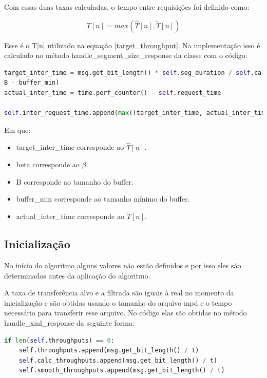 \documentclass[10pt,twocolumn,letterpaper]{article}
\begin{document}
	Com essas duas taxas calculadas, o tempo entre requisições foi definido como:
	
	\begin{equation}
		T[n] = max(\hat{T}[n], \tilde{T}[n])
	\end{equation}
	
	Esse é o T[n] utilizado na equação \ref{target_throughput}. Na implementação isso é calculado no método handle\_segment\_size\_response da classe com o código:
	
	\begin{lstlisting}[language=python]
target_inter_time = msg.get_bit_length() * self.seg_duration / self.calc_throughputs[-1] + beta * (
B - buffer_min)
actual_inter_time = time.perf_counter() - self.request_time

self.inter_request_time.append(max((target_inter_time, actual_inter_time))) 
	\end{lstlisting}
	
	Em que:
	
	\begin{itemize}
		\item target\_inter\_time corresponde ao $\hat{T}[n]$.
		\item beta corresponde ao $\beta$.
		\item B corresponde ao tamanho do buffer.
		\item buffer\_min corresponde ao tamanho mínimo do buffer.
		\item actual\_inter\_time corresponde ao $\tilde{T}[n]$.
	\end{itemize}
	
	\subsection{Inicialização}
	No início do algoritmo alguns valores não estão definidos e por isso eles são determinados antes da aplicação do algoritmo.
	
	A taxa de transferência alvo e a filtrada são iguais à real no momento da inicialização e são obtidas usando o tamanho do arquivo mpd e o tempo necessário para transferir esse arquivo. No código elas são obtidas no método handle\_xml\_response da seguinte forma:
	
	\begin{lstlisting}[language=python]
if len(self.throughputs) == 0:
	self.throughputs.append(msg.get_bit_length() / t)
	self.calc_throughputs.append(msg.get_bit_length() / t)
	self.smooth_throughputs.append(msg.get_bit_length() / t)
	\end{lstlisting}
	
\end{document}
